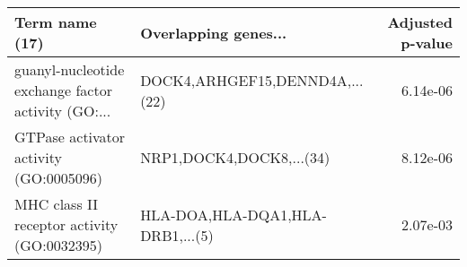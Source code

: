 \begin{tabular}{llr}
\toprule
                                    Term name (17) &             Overlapping genes... &  Adjusted p-value \\
\midrule
guanyl-nucleotide exchange factor activity (GO:... &   DOCK4,ARHGEF15,DENND4A,...(22) &          6.14e-06 \\
            GTPase activator activity (GO:0005096) &         NRP1,DOCK4,DOCK8,...(34) &          8.12e-06 \\
       MHC class II receptor activity (GO:0032395) & HLA-DOA,HLA-DQA1,HLA-DRB1,...(5) &          2.07e-03 \\
\bottomrule
\end{tabular}
